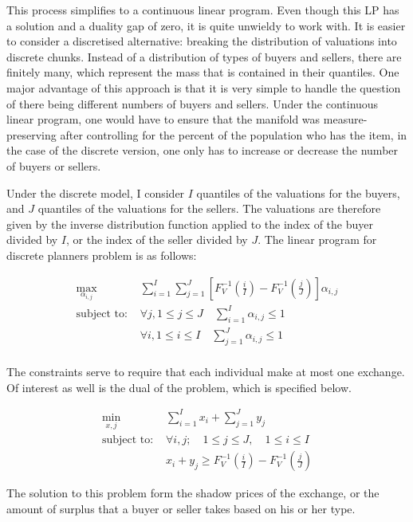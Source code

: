 \documentclass[12pt, letterpaper]{paper}
\begin{document}
This process simplifies to a continuous linear program. Even though
this LP has a solution and a duality gap of zero, it is quite unwieldy
to work with. It is easier to consider a discretised alternative:
breaking the distribution of valuations into discrete chunks. Instead
of a distribution of types of buyers and sellers, there are finitely
many, which represent the mass that is contained in their
quantiles. One major advantage of this approach is that it is very
simple to handle the question of there being different numbers of
buyers and sellers. Under the continuous linear program, one
would have to ensure that the manifold was measure-preserving after
controlling for the percent of the population who has the item, in the
case of the discrete version, one only has to increase or decrease the
number of buyers or sellers. 

Under the discrete model, I consider $I$ quantiles of the valuations
for the buyers, and $J$ quantiles of the valuations for the sellers. The
valuations are therefore given by the inverse distribution function
applied to the index of the buyer divided by $I$, or the index of the
seller divided by $J$. The linear program for discrete planners problem
is as follows:

\begin{align*}
\max_{\alpha_{i,j}} & \sum_{i=1}^I \sum_{j=1}^J \left [ F_V^{-1} \left ( \frac{i}{I} \right ) - F_V^{-1} \left ( \frac{j}{J} \right ) \right ] \alpha_{i,j }\\
\text{subject to: } & \forall j, 1 \leq j \le J \quad \sum_{i=1}^I \alpha_{i,j} \leq 1 \\
& \forall i, 1 \leq i \leq I \quad \sum_{j=1}^J \alpha_{i,j} \le 1 \\
\end{align*}

The constraints serve to require that each individual make at most
one exchange. Of interest as well is the dual of the problem, which is
specified below.

\begin{align*}
\min_{x,j} & \sum_{i=1}^I x_i + \sum_{j=1}^J y_j \\
\text{subject to: } & \forall i,j; \quad 1 \leq j \leq J, \quad 1 \le i \leq I\\
& x_i + y_j \geq F_V^{-1} \left ( \frac{i}{I} \right ) - F_V^{-1} \left ( \frac{j}{J} \right ) 
\end{align*}

The solution to this problem form the shadow prices of the exchange,
or the amount of surplus that a buyer or seller takes based on his or
her type. 
\end{document}
